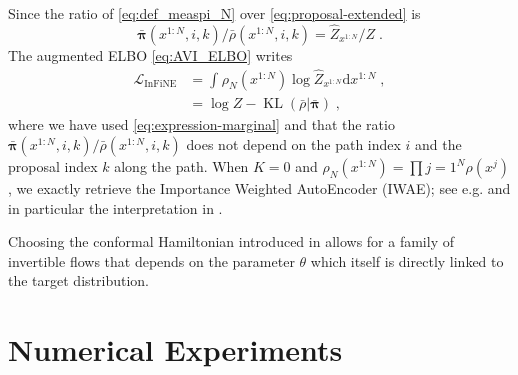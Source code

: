 \documentclass{article}
\def\elboneq{\mathcal{L}_{\IFIS}}
\def\IFIS{\ensuremath{\operatorname{InFiNE}}}
\def\rmd{\operatorname{d}\hspace{-2pt}}
\def\rmd{\mathrm{d}}
\def\eqsp{\,}
\def\eqsp{\;}
\newcommand{\1}{\mathds{1}}
\def\proposal{\rho}
\newcommand{\chunku}[3]{#1^{#2:#3}}
\def\const{Z}
\newcommand{\estConstC}[1]{\widehat{Z}_{#1}}
\def\measpi{\boldsymbol{\pi}}
\def\rmd{\mathrm{d}}
\begin{document}

Since the ratio of \eqref{eq:def_measpi_N} over \eqref{eq:proposal-extended} is
\begin{equation}
\label{eq:ratio-extended}
{\bar{\measpi}(\chunku{x}{1}{N},i,k)}\big/{\bar{\proposal}(\chunku{x}{1}{N},i,k)}= {\estConstC{\chunku{x}{1}{N}}}\big/{\const} \eqsp.
\end{equation}
The augmented ELBO   \eqref{eq:AVI_ELBO} writes
\begin{align}
 \label{eq:infine_elbo-alt}
\elboneq &= \int_{} \proposal_N( \chunku{x}{1}{N})   \log \estConstC{\chunku{x}{1}{N}} \rmd \chunku{x}{1}{N}\eqsp,\\
\nonumber
 &=  \log \const - \operatorname{KL}( \bar{\proposal} | \bar{\measpi} )\eqsp,
\end{align}
where we have used \eqref{eq:expression-marginal} and that the ratio ${\bar{\measpi}(\chunku{x}{1}{N},i,k)}\big/{\bar{\proposal}(\chunku{x}{1}{N},i,k)}$ does not depend on 
the path index $i$ and the proposal index $k$ along the path. When $K=0$ and $\proposal_N(\chunku{x}{1}{N})= \prod{j=1}^N \proposal(x^j)$, we exactly retrieve the Importance Weighted AutoEncoder (IWAE); see e.g.  \cite{burda:grosse:2015} and in particular the interpretation in \cite{cremer2017reinterpreting}. 

Choosing the conformal Hamiltonian introduced in  allows for a family of invertible flows that depends on the parameter $\theta$ which itself is directly linked to the target distribution.


\section{Numerical Experiments}
\end{document}
